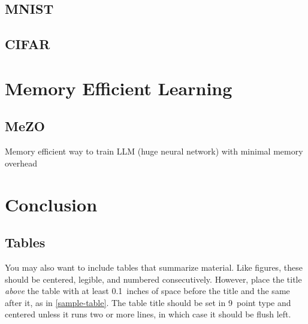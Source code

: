 \documentclass[nohyperref]{article}
\theoremstyle{plain}
\theoremstyle{definition}
\theoremstyle{remark}
\begin{document}
\subsection{MNIST}
\subsection{CIFAR}


\section{Memory Efficient Learning}
\subsection{MeZO}
Memory efficient way to train LLM (huge neural network) with minimal memory overhead \cite{malladi2023finetuning}

\section{Conclusion}



\subsection{Tables}

You may also want to include tables that summarize material. Like
figures, these should be centered, legible, and numbered consecutively.
However, place the title \emph{above} the table with at least
0.1~inches of space before the title and the same after it, as in
\cref{sample-table}. The table title should be set in 9~point
type and centered unless it runs two or more lines, in which case it
should be flush left.

\end{document}
